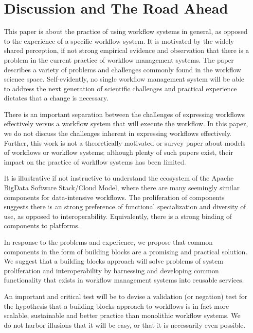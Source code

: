 \section{Discussion and The Road Ahead}\label{discussion}

This paper is about the practice of using workflow systems in general, as
opposed to the experience of a specific workflow system. It is motivated by
the widely shared perception, if not strong empirical evidence and observation
that there is a problem in the current practice of workflow management
systems. The paper describes a variety of problems and challenges commonly
found in the workflow science space. Self-evidently, no single workflow
management system will be able to address the next generation of scientific
challenges and practical experience dictates that a change is necessary.

There is an important separation between the challenges of expressing
workflows effectively versus a workflow system that will execute the workflow.
In this paper, we do not discuss the challenges inherent in expressing
workflows effectively. Further, this work is not a theoretically motivated or
survey paper about models of workflows or workflow systems; although plenty of
such papers exist, their impact on the practice of workflow systems has been
limited.

It is illustrative if not instructive to understand the ecosystem of the
Apache BigData Software Stack/Cloud Model, where there are many seemingly
similar components for  data-intensive workflows. The proliferation of
components suggests there is an strong preference of functional specialization
and diversity of use, as opposed to interoperability.  Equivalently, there
is a strong binding of components to platforms.

In response to the problems and experience, we propose that common components
in the form of building blocks are a promising and practical solution. We
suggest that a building blocks approach will solve problems of system
proliferation and interoperability by harnessing and developing common
functionality that exists in workflow management systems into reusable
services.

An important and critical test will be to devise a validation (or negation)
test for the hypothesis that a building blocks approach to workflows is in fact
more scalable, sustainable and better practice than monolithic workflow
systems. We do not harbor illusions that it will be easy, or that it is
necessarily even possible.



